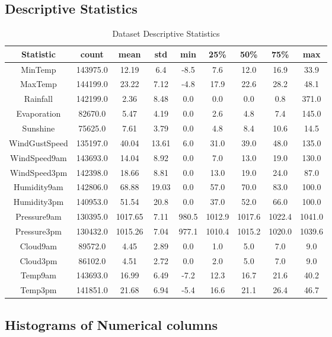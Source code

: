 \documentclass{article}%
\begin{document}
%
\newpage%
\subsection{Descriptive Statistics}%
\label{subsec:DescriptiveStatistics}%


\begin{table}[h!]%
\caption{Dataset Descriptive Statistics}%
\vspace{0.2cm}%
\centering%
\begin{tabular}{|c|c|c|c|c|c|c|c|c|}%
\hline%
Statistic&count&mean&std&min&25\%&50\%&75\%&max\\%
\hline%
MinTemp&143975.0&12.19&6.4&{-}8.5&7.6&12.0&16.9&33.9\\%
MaxTemp&144199.0&23.22&7.12&{-}4.8&17.9&22.6&28.2&48.1\\%
Rainfall&142199.0&2.36&8.48&0.0&0.0&0.0&0.8&371.0\\%
Evaporation&82670.0&5.47&4.19&0.0&2.6&4.8&7.4&145.0\\%
Sunshine&75625.0&7.61&3.79&0.0&4.8&8.4&10.6&14.5\\%
WindGustSpeed&135197.0&40.04&13.61&6.0&31.0&39.0&48.0&135.0\\%
WindSpeed9am&143693.0&14.04&8.92&0.0&7.0&13.0&19.0&130.0\\%
WindSpeed3pm&142398.0&18.66&8.81&0.0&13.0&19.0&24.0&87.0\\%
Humidity9am&142806.0&68.88&19.03&0.0&57.0&70.0&83.0&100.0\\%
Humidity3pm&140953.0&51.54&20.8&0.0&37.0&52.0&66.0&100.0\\%
Pressure9am&130395.0&1017.65&7.11&980.5&1012.9&1017.6&1022.4&1041.0\\%
Pressure3pm&130432.0&1015.26&7.04&977.1&1010.4&1015.2&1020.0&1039.6\\%
Cloud9am&89572.0&4.45&2.89&0.0&1.0&5.0&7.0&9.0\\%
Cloud3pm&86102.0&4.51&2.72&0.0&2.0&5.0&7.0&9.0\\%
Temp9am&143693.0&16.99&6.49&{-}7.2&12.3&16.7&21.6&40.2\\%
Temp3pm&141851.0&21.68&6.94&{-}5.4&16.6&21.1&26.4&46.7\\%
\hline%
\end{tabular}%
\end{table}

%
\newpage%
\subsection{Histograms of Numerical columns}%
\label{subsec:HistogramsofNumericalcolumns}%
\end{document}

